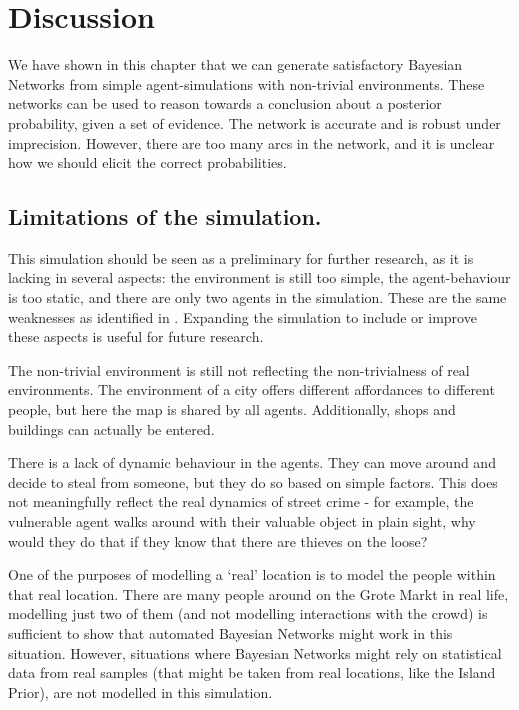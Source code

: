 \section{Discussion}

We have shown in this chapter that we can generate satisfactory Bayesian Networks from simple agent-simulations with non-trivial environments. These networks can be used to reason towards a conclusion about a posterior probability, given a set of evidence. The network is accurate and is robust under imprecision. However, there are too many arcs in the network, and it is unclear how we should elicit the correct probabilities.

\subsection{Limitations of the simulation.}
This simulation should be seen as a preliminary for further research, as it is lacking in several aspects: the environment is still too simple, the agent-behaviour is too static, and there are only two agents in the simulation. These are the same weaknesses as identified in \citep{Zhu2021}. Expanding the simulation to include or improve these aspects is useful for future research.

The non-trivial environment is still not reflecting the non-trivialness of real environments. The environment of a city offers different affordances to different people, but here the map is shared by all agents. Additionally, shops and buildings can actually be entered.

There is a lack of dynamic behaviour in the agents. They can move around and decide to steal from someone, but they do so based on simple factors. This does not meaningfully reflect the real dynamics of street crime - for example, the vulnerable agent walks around with their valuable object in plain sight, why would they do that if they know that there are thieves on the loose?

One of the purposes of modelling a `real' location is to model the people within that real location. There are many people around on the Grote Markt in real life, modelling just two of them (and not modelling interactions with the crowd) is sufficient to show that automated Bayesian Networks might work in this situation. However, situations where Bayesian Networks might rely on statistical data from real samples (that might be taken from real locations, like the Island Prior), are not modelled in this simulation. 



